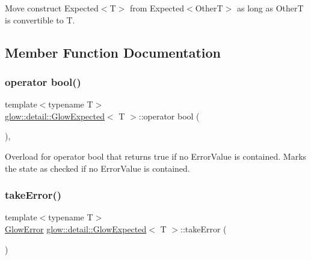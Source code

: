 Move construct Expected$<$\+T$>$ from Expected$<$\+Other\+T$>$ as long as OtherT is convertible to T. 

\subsection{Member Function Documentation}
\mbox{\label{classglow_1_1detail_1_1_glow_expected_a5f11ce0f16940007250f5e3c516903a1}} 
\subsubsection{\texorpdfstring{operator bool()}{operator bool()}}
{\footnotesize\ttfamily template$<$typename T$>$ \\
\hyperlink{classglow_1_1detail_1_1_glow_expected}{glow\+::detail\+::\+Glow\+Expected}$<$ T $>$\+::operator bool (\begin{DoxyParamCaption}{ }\end{DoxyParamCaption})\hspace{0.3cm}{\ttfamily [inline]}, {\ttfamily [explicit]}}

Overload for operator bool that returns true if no Error\+Value is contained. Marks the state as checked if no Error\+Value is contained. \mbox{\label{classglow_1_1detail_1_1_glow_expected_a694628a1468d324f12b2ecd6d553797f}} 
\subsubsection{\texorpdfstring{take\+Error()}{takeError()}}
{\footnotesize\ttfamily template$<$typename T$>$ \\
\hyperlink{classglow_1_1detail_1_1_glow_error}{Glow\+Error} \hyperlink{classglow_1_1detail_1_1_glow_expected}{glow\+::detail\+::\+Glow\+Expected}$<$ T $>$\+::take\+Error (\begin{DoxyParamCaption}{ }\end{DoxyParamCaption})\hspace{0.3cm}{\ttfamily [inline]}}

